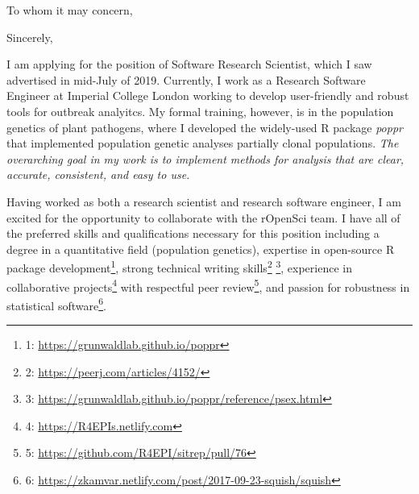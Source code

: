


\clearpage

\date{\today} %
\opening{To whom it may concern,} %
\closing{Sincerely,} %

\makelettertitle %

I am applying for the position of Software Research Scientist, which I saw 
advertised in mid-July of 2019. Currently, I work as a Research Software
Engineer at Imperial College London working to develop user-friendly and robust
tools for outbreak analyitcs. My formal training, however, is in
the population genetics of plant pathogens, where I developed the widely-used
R package \textit{poppr} that implemented population genetic analyses partially
clonal populations. \textit{The overarching goal in my work is to implement
methods for analysis that are clear, accurate, consistent, and easy to use.}

Having worked as both a research scientist and research software engineer, I am
excited for the opportunity to collaborate with the rOpenSci team. I have all of
the preferred skills and qualifications necessary for this position including
a degree in a quantitative field (population genetics), expertise in
open-source R package development\footnote{1:
\url{https://grunwaldlab.github.io/poppr}}, strong technical writing
skills\footnote{2: \url{https://peerj.com/articles/4152/}} \footnote{3:
\url{https://grunwaldlab.github.io/poppr/reference/psex.html}}, experience in
collaborative projects\footnote{4: \url{https://R4EPIs.netlify.com}} with
respectful peer review\footnote{5:
\url{https://github.com/R4EPI/sitrep/pull/76}}, and passion for robustness in
statistical software\footnote{6: \url{https://zkamvar.netlify.com/post/2017-09-23-squish/squish}}.




